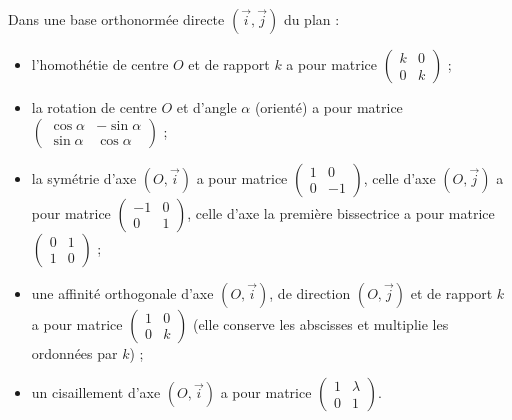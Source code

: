 \documentclass[11pt]{article}
\newcommand{\cle}[1]{{\popxbold\color{popdark}#1}}
\begin{document}
\begin{propriete}
Dans une base orthonormée directe $(\vec{i}, \vec{j})$ du plan :
\begin{itemize}
\item l'\cle{homothétie} de centre $O$ et de rapport $k$ a pour matrice $\begin{pmatrix} k & 0 \\ 0 & k \end{pmatrix}$ ;
\item la \cle{rotation} de centre $O$ et d'angle $\alpha$ (orienté) a pour matrice $\begin{pmatrix} \cos\alpha & -\sin\alpha \\ \sin\alpha & \cos\alpha \end{pmatrix}$ ;
\item la \cle{symétrie} d'axe $(O,\vec{i})$ a pour matrice $\begin{pmatrix} 1 & 0 \\ 0 & -1 \end{pmatrix}$, celle d'axe $(O,\vec{j})$ a pour matrice $\begin{pmatrix} -1 & 0 \\ 0 & 1 \end{pmatrix}$, celle d'axe la première bissectrice a pour matrice $\begin{pmatrix} 0 & 1 \\ 1 & 0 \end{pmatrix}$ ;
\item une \cle{affinité orthogonale} d'axe $(O,\vec{i})$, de direction $(O,\vec{j})$ et de rapport $k$ a pour matrice $\begin{pmatrix} 1 & 0 \\ 0 & k \end{pmatrix}$ (elle conserve les abscisses et multiplie les ordonnées par $k$) ;
\item un \cle{cisaillement} d'axe $(O,\vec{i})$ a pour matrice $\begin{pmatrix} 1 & \lambda \\ 0 & 1 \end{pmatrix}$.
\end{itemize}
\end{propriete}
\end{document}
